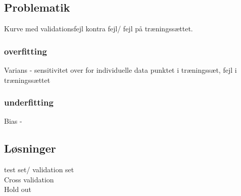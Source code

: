 \subsection{Problematik}

Kurve med validationsfejl kontra fejl/ fejl på træningssættet. 

\subsubsection{overfitting}
Varians - sensitivitet over for individuelle data punktet i træningssæt, fejl i træningssættet
\subsubsection{underfitting}
Bias - 

\subsection{Løsninger}
test set/ validation set
\\ Cross validation
\\ Hold out
